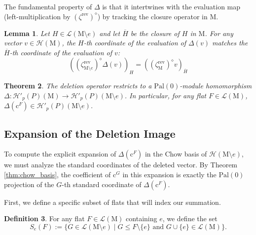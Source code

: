 \documentclass{article}
\newcommand{\rev}{\mathrm{rev}}
\newcommand{\M}{\mathrm{M}}
\newcommand{\Pal}[1]{\mathrm{Pal}(#1)}
\newcommand{\Cbasis}[1]{\mathrm{c}^{#1}}
\newcommand{\cbasis}[1]{\mathcal{H}'_{#1}(P)}
\newtheorem{theorem}{Theorem}[section]
\newtheorem{lemma}[theorem]{Lemma}
\theoremstyle{definition}
\newtheorem{definition}[theorem]{Definition}
\theoremstyle{remark}
\begin{document}
The fundamental property of \(\Delta\) is that it intertwines with the evaluation map (left-multiplication by \((\zeta^\rev)^\diamond\)) by tracking the closure operator in \(\M\).

\begin{lemma} \label{lem:intertwining}
    Let \(H \in \mathcal{L}(\M \setminus e)\) and let \(\overline{H}\) be the closure of \(H\) in \(\M\). For any vector \(v \in \mathcal{H}(\M)\), the \(H\)-th coordinate of the evaluation of \(\Delta(v)\) matches the \(\overline{H}\)-th coordinate of the evaluation of \(v\):
    \[ \left( (\zeta^\rev_{\M \setminus e})^\diamond \Delta(v) \right)_H = \left( (\zeta^\rev_{\M})^\diamond v \right)_{\overline{H}} \]
\end{lemma}

\begin{theorem}
    The deletion operator restricts to a \(\Pal{0}\)-module homomorphism \(\Delta: \cbasis{p}(\M) \to \cbasis{p}(\M \setminus e)\). In particular, for any flat \(F \in \mathcal{L}(\M)\), \(\Delta(\Cbasis{F}) \in \cbasis{p}(\M \setminus e)\).
\end{theorem}

\subsection{Expansion of the Deletion Image}

To compute the explicit expansion of \(\Delta(\Cbasis{F})\) in the Chow basis of \(\mathcal{H}(\M \setminus e)\), we must analyze the standard coordinates of the deleted vector. By Theorem \ref{thm:chow_basis}, the coefficient of \(\Cbasis{G}\) in this expansion is exactly the \(\Pal{0}\) projection of the \(G\)-th standard coordinate of \(\Delta(\Cbasis{F})\). 

First, we define a specific subset of flats that will index our summation.

\begin{definition}
    For any flat \(F \in \mathcal{L}(\M)\) containing \(e\), we define the set 
    \[ S_e(F) := \{ G \in \mathcal{L}(\M \setminus e) \mid G \le F \setminus \{e\} \text{ and } G \cup \{e\} \in \mathcal{L}(\M) \}. \]
\end{definition}
\end{document}
